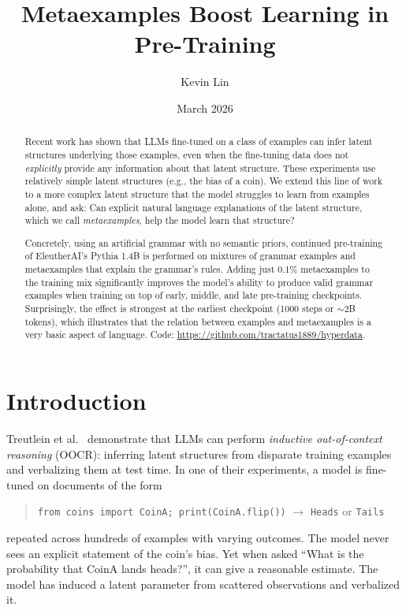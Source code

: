 \documentclass[11pt]{article}
\title{Metaexamples Boost Learning in Pre-Training}
\author{Kevin Lin}
\date{March 2026}
\begin{document}
\maketitle

\begin{abstract}
Recent work has shown that LLMs fine-tuned on a class of examples can infer latent structures underlying those examples, even when the fine-tuning data does not \emph{explicitly} provide any information about that latent structure. These experiments use relatively simple latent structures (e.g., the bias of a coin). We extend this line of work to a more complex latent structure that the model struggles to learn from examples alone, and ask: Can explicit natural language explanations of the latent structure, which we call \emph{metaexamples}, help the model learn that structure?

Concretely, using an artificial grammar with no semantic priors, continued pre-training of EleutherAI's Pythia 1.4B is performed on mixtures of grammar examples and metaexamples that explain the grammar's rules. Adding just 0.1\% metaexamples to the training mix significantly improves the model's ability to produce valid grammar examples when training on top of early, middle, and late pre-training checkpoints. Surprisingly, the effect is strongest at the earliest checkpoint (1000 steps or ${\sim}$2B tokens), which illustrates that the relation between examples and metaexamples is a very basic aspect of language. Code: \url{https://github.com/tractatus1889/hyperdata}.
\end{abstract}

\section{Introduction}

Treutlein et al.~\cite{treutlein2024} demonstrate that LLMs can perform \emph{inductive out-of-context reasoning} (OOCR): inferring latent structures from disparate training examples and verbalizing them at test time. In one of their experiments, a model is fine-tuned on documents of the form

\begin{quote}
\texttt{from coins import CoinA; print(CoinA.flip())} $\longrightarrow$ \texttt{Heads} \textrm{or} \texttt{Tails}
\end{quote}

\noindent repeated across hundreds of examples with varying outcomes. The model never sees an explicit statement of the coin's bias. Yet when asked ``What is the probability that CoinA lands heads?'', it can give a reasonable estimate. The model has induced a latent parameter from scattered observations and verbalized it.
\end{document}
